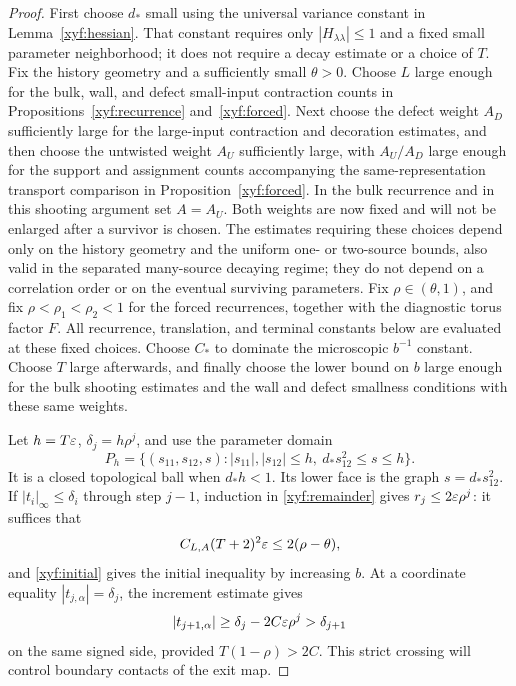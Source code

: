 \begin{proof}
First choose \(d_*\) small using the universal variance constant in
Lemma~\ref{xyf:hessian}.  That constant requires only
\(|H_{\lambda\lambda}|\le1\) and a fixed small parameter
neighborhood; it does not require a decay estimate or a choice of
\(T\).  Fix the history geometry and a sufficiently small
\(\theta>0\).  Choose \(L\) large enough for the bulk, wall, and
defect small-input contraction counts in
Propositions~\ref{xyf:recurrence} and~\ref{xyf:forced}.
Next choose the defect weight \(A_D\) sufficiently large for the
large-input contraction and decoration estimates, and then choose
the untwisted weight \(A_U\) sufficiently large, with
\(A_U/A_D\) large enough for the support and assignment counts accompanying
the same-representation transport comparison in
Proposition~\ref{xyf:forced}.  In the bulk recurrence and in this
shooting argument set \(A=A_U\).  Both weights are now fixed and
will not be enlarged after a survivor is chosen.  The estimates
requiring these choices depend only on the history geometry and
the uniform one- or two-source bounds, also valid in the separated
many-source decaying regime; they do not depend on a correlation
order or on the eventual surviving parameters.
Fix \(\rho\in(\theta,1)\), and fix
\(\rho<\rho_1<\rho_2<1\) for the forced recurrences, together with
the diagnostic torus factor \(F\).  All recurrence, translation,
and terminal constants below are evaluated at these fixed choices.
Choose \(C_*\) to dominate the microscopic \(b^{-1}\) constant.
Choose \(T\) large afterwards, and finally choose the lower bound
on \(b\) large enough for the bulk shooting estimates and the
wall and defect smallness conditions with these same weights.

Let \(h=T\varepsilon\), \(\delta_j=h\rho^j\), and use the parameter domain
\begin{equation}
 P_h=\{(s_{11},s_{12},s): |s_{11}|,|s_{12}|\le h,
                     \ d_*s_{12}^2\le s\le h\}.
 \label{xyf:parameterdomain}
\end{equation}
It is a closed topological ball when \(d_*h<1\).  Its lower face
is the graph \(s=d_*s_{12}^2\).  If
\(|t_i|_\infty\le\delta_i\) through step \(j-1\), induction in
\eqref{xyf:remainder} gives \(r_j\le2\varepsilon\rho^j\): it suffices that
\[
 C_{L,A}(T+2)^2\varepsilon\le2(\rho-\theta),
\]
and \eqref{xyf:initial} gives the initial inequality by increasing
\(b\).  At a coordinate equality
\(|t_{j,\alpha}|=\delta_j\), the increment estimate gives
\[
 |t_{j+1,\alpha}|\ge\delta_j-2C\varepsilon\rho^j>\delta_{j+1}
\]
on the same signed side, provided \(T(1-\rho)>2C\).
This strict crossing will control boundary contacts of the exit map.


\end{proof}
